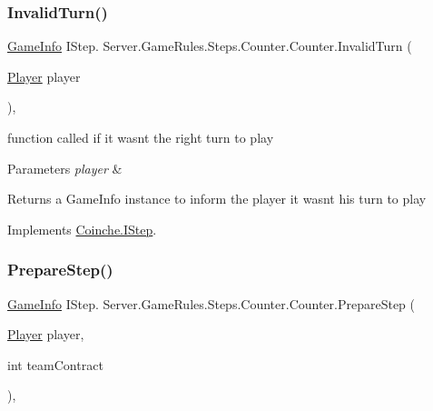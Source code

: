 \subsubsection{\texorpdfstring{Invalid\+Turn()}{InvalidTurn()}}
{\footnotesize\ttfamily \hyperlink{class_coinche_1_1_tools_1_1_game_info}{Game\+Info} I\+Step. Server.\+Game\+Rules.\+Steps.\+Counter.\+Counter.\+Invalid\+Turn (\begin{DoxyParamCaption}\item[{\hyperlink{class_coinche_1_1_player}{Player}}]{player }\end{DoxyParamCaption})\hspace{0.3cm}{\ttfamily [inline]}, {\ttfamily [private]}}



function called if it wasn\textquotesingle{}t the right turn to play 


\begin{DoxyParams}{Parameters}
{\em player} & \\
\hline
\end{DoxyParams}
\begin{DoxyReturn}{Returns}
a Game\+Info instance to inform the player it wasn\textquotesingle{}t his turn to play
\end{DoxyReturn}


Implements \hyperlink{interface_coinche_1_1_i_step_afc64813670860f5ee0829264751abc0a}{Coinche.\+I\+Step}.

\mbox{\label{class_server_1_1_game_rules_1_1_steps_1_1_counter_1_1_counter_a84412648384fce7fea870e5e1e32bc3d}} 
\subsubsection{\texorpdfstring{Prepare\+Step()}{PrepareStep()}}
{\footnotesize\ttfamily \hyperlink{class_coinche_1_1_tools_1_1_game_info}{Game\+Info} I\+Step. Server.\+Game\+Rules.\+Steps.\+Counter.\+Counter.\+Prepare\+Step (\begin{DoxyParamCaption}\item[{\hyperlink{class_coinche_1_1_player}{Player}}]{player,  }\item[{int}]{team\+Contract }\end{DoxyParamCaption})\hspace{0.3cm}{\ttfamily [inline]}, {\ttfamily [private]}}



